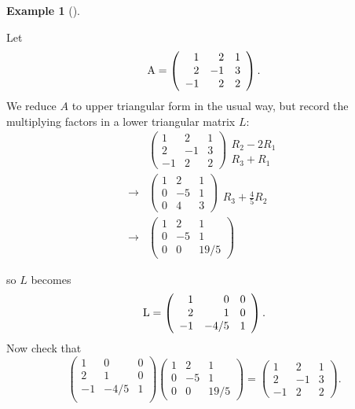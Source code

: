 \documentclass[
  a4paper,
  DIV=11,
  numbers=noendperiod,
  oneside]{scrreprt}
\theoremstyle{definition}
\newtheorem{example}{Example}[chapter]
\theoremstyle{remark}
\begin{document}
\begin{example}[]\protect\hypertarget{exm-lufactorization}{}\label{exm-lufactorization}

Let \[{\rm A} =\left(\begin{array}{rrr}
 1  & 2  & 1  \\
 2  & {-1}  & 3  \\
 {-1}  & 2  & 2  
\end{array} \right).\] We reduce \(A\) to upper triangular form in the
usual way, but record the multiplying factors in a lower triangular
matrix \(L\): \[\begin{aligned}
& \left(\begin{array}{rrr}
1 & 2 & 1 \\
2 & -1 & 3 \\
-1 & 2 & 2
\end{array}\right)
\begin{array}{r}
\\
R_2-2R_1 \\
R_3+R_1
\end{array} \\
\rightarrow &
\left(\begin{array}{rrr}
1 & 2 & 1 \\
0 & -5 & 1 \\
0 & 4 & 3
\end{array}\right)
\begin{array}{c}
\\
\\
R_3+\frac{4}{5}R_2
\end{array} \\
\rightarrow &
\left(\begin{array}{rrr}
1 & 2 & 1\\
0 & -5 & 1\\
0 & 0 & 19/5
\end{array}\right)
\end{aligned}\]

so \(L\) becomes \[{\rm L} = \left(\begin{array}{rrr}
 1  & 0  & 0  \\
 2  & 1  & 0  \\
 {-1}  & {-4/5}  & 1  
\end{array} \right).\] Now check that \[\left(\begin{array}{rrr}
 1  & 0  & 0  \\
 2  & 1  & 0  \\
 {-1}  & {-4/5}  & 1  \\
\end{array} \right)\left(\begin{array}{rrr}
 1  & 2  & 1  \\
 0  & {-5}  & 1  \\
 0  & 0  & {19/5}  
\end{array} \right)=\left(\begin{array}{rrr}
 1  & 2  & 1  \\
 2  & {-1}  & 3  \\
 {-1}  & 2  & 2  
\end{array} \right).\]

\end{example}
\end{document}
